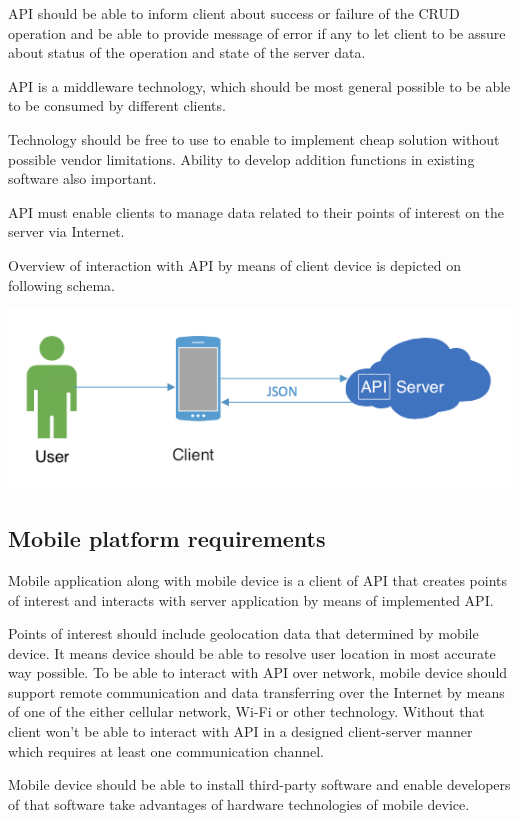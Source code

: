 \documentclass[thesis=M,english]{FITthesis}[2012/10/20]
\begin{document}
API should be able to inform client about success or failure of the CRUD operation and be able to provide message of error if any to let client to be assure about status of the operation and state of the server data.

API is a middleware technology, which should be most general possible to be able to be consumed by different clients.

Technology should be free to use to enable to implement cheap solution without possible vendor limitations. Ability to develop addition functions in existing software also important.

API must enable clients to manage data related to their points of interest on the server via Internet.

Overview of interaction with API by means of client device is depicted on following schema.

\includegraphics[width=1.0\textwidth]{images/architecture}

\subsection{Mobile platform requirements}

Mobile application along with mobile device is a client of API that creates points of interest and interacts with server application by means of implemented API.

Points of interest should include geolocation \cite{geolocation} data that determined by mobile device. It means device should be able to resolve user location in most accurate way possible. To be able to interact with API over network, mobile device should support remote communication and data transferring over the Internet by means of one of the either cellular network, Wi-Fi or other technology. Without that client won't be able to interact with API in a designed client-server manner which requires at least one communication channel.

Mobile device should be able to install third-party software and enable developers of that software take advantages of hardware technologies of mobile device. 
\end{document}
